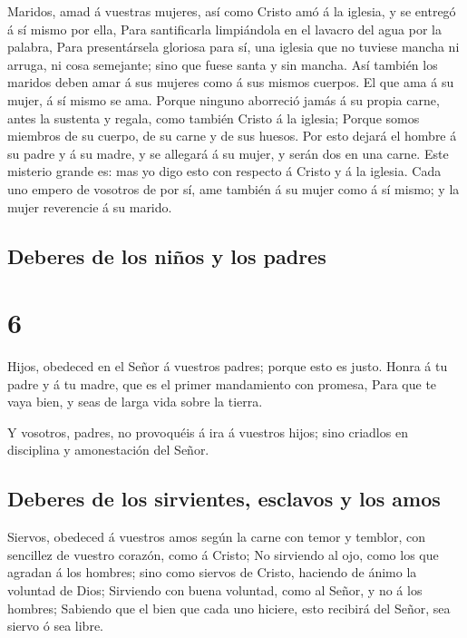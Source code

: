  Maridos, amad á vuestras mujeres, así como Cristo amó á
la iglesia, y se entregó á sí mismo por ella,  Para
santificarla limpiándola en el lavacro del agua por la palabra,
 Para presentársela gloriosa para sí, una iglesia que no
tuviese mancha ni arruga, ni cosa semejante; sino que fuese santa y sin
mancha.  Así también los maridos deben amar á sus mujeres
como á sus mismos cuerpos. El que ama á su mujer, á sí mismo se ama.
 Porque ninguno aborreció jamás á su propia carne, antes
la sustenta y regala, como también Cristo á la iglesia; 
Porque somos miembros de su cuerpo, de su carne y de sus huesos.
 Por esto dejará el hombre á su padre y á su madre, y se
allegará á su mujer, y serán dos en una carne.  Este
misterio grande es: mas yo digo esto con respecto á Cristo y á la
iglesia.  Cada uno empero de vosotros de por sí, ame
también á su mujer como á sí mismo; y la mujer reverencie á su marido.

\hypertarget{deberes-de-los-niuxf1os-y-los-padres}{%
\subsection{Deberes de los niños y los
padres}\label{deberes-de-los-niuxf1os-y-los-padres}}

\hypertarget{section-5}{%
\section{6}\label{section-5}}

 Hijos, obedeced en el Señor á vuestros padres; porque
esto es justo.  Honra á tu padre y á tu madre, que es el
primer mandamiento con promesa,  Para que te vaya bien, y
seas de larga vida sobre la tierra.

 Y vosotros, padres, no provoquéis á ira á vuestros hijos;
sino criadlos en disciplina y amonestación del Señor.

\hypertarget{deberes-de-los-sirvientes-esclavos-y-los-amos}{%
\subsection{Deberes de los sirvientes, esclavos y los
amos}\label{deberes-de-los-sirvientes-esclavos-y-los-amos}}

 Siervos, obedeced á vuestros amos según la carne con
temor y temblor, con sencillez de vuestro corazón, como á Cristo;
 No sirviendo al ojo, como los que agradan á los hombres;
sino como siervos de Cristo, haciendo de ánimo la voluntad de Dios;
 Sirviendo con buena voluntad, como al Señor, y no á los
hombres;  Sabiendo que el bien que cada uno hiciere, esto
recibirá del Señor, sea siervo ó sea libre.

